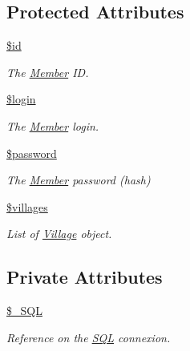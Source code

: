 \subsection*{Protected Attributes}
\begin{DoxyCompactItemize}
\item 
\mbox{\label{classMember_aa65bcf3ccbc37e49a1c58b6ce3b7a386}} 
\mbox{\hyperlink{classMember_aa65bcf3ccbc37e49a1c58b6ce3b7a386}{\$id}}
\begin{DoxyCompactList}\small\item\em The \mbox{\hyperlink{classMember}{Member}} ID. \end{DoxyCompactList}\item 
\mbox{\label{classMember_a07c5e5efcaa4a129a3228424a0d58f57}} 
\mbox{\hyperlink{classMember_a07c5e5efcaa4a129a3228424a0d58f57}{\$login}}
\begin{DoxyCompactList}\small\item\em The \mbox{\hyperlink{classMember}{Member}} login. \end{DoxyCompactList}\item 
\mbox{\label{classMember_a8ed491893ed68a3471ee7bbcfc746080}} 
\mbox{\hyperlink{classMember_a8ed491893ed68a3471ee7bbcfc746080}{\$password}}
\begin{DoxyCompactList}\small\item\em The \mbox{\hyperlink{classMember}{Member}} password (hash) \end{DoxyCompactList}\item 
\mbox{\label{classMember_aa875e5b954df4f039d060ed033286efb}} 
\mbox{\hyperlink{classMember_aa875e5b954df4f039d060ed033286efb}{\$villages}}
\begin{DoxyCompactList}\small\item\em List of \mbox{\hyperlink{classVillage}{Village}} object. \end{DoxyCompactList}\end{DoxyCompactItemize}
\subsection*{Private Attributes}
\begin{DoxyCompactItemize}
\item 
\mbox{\label{classMember_ab4eb199b244a08e19c2804469e249b2b}} 
\mbox{\hyperlink{classMember_ab4eb199b244a08e19c2804469e249b2b}{\$\+\_\+\+S\+QL}}
\begin{DoxyCompactList}\small\item\em Reference on the \mbox{\hyperlink{classSQL}{S\+QL}} connexion. \end{DoxyCompactList}\end{DoxyCompactItemize}


